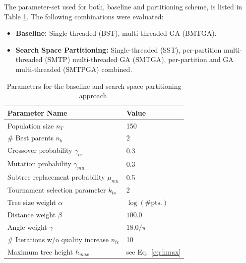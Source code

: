 The parameter-set used for both, baseline and partitioning scheme, is listed in Table \ref{tab:gaparams}.
The following combinations were evaluated:
\begin{itemize}
	\item \textbf{Baseline:} Single-threaded (BST), multi-threaded \ac{GA} (BMTGA).
	\item \textbf{Search Space Partitioning:} Single-threaded (SST), per-partition multi-threaded (SMTP) multi-threaded \ac{GA} (SMTGA), per-partition and \ac{GA} multi-threaded (SMTPGA) combined.
\end{itemize}
\begin{table}[h]
	\centering
	\begin{tabular}{|l|l|}
		\hline
		\textbf{Parameter Name} & \textbf{Value}  \\
		\hline
		Population size $n_T$ & 150 \\
		\hline
		\# Best parents $n_b$ & 2 \\
		\hline
		Crossover probability $\gamma_{cr}$& 0.3 \\
		\hline
		Mutation probability $\gamma_{mu}$& 0.3 \\
		\hline
		Subtree replacement probability $\mu_{mu}$& 0.5 \\
		\hline
		Tournament selection parameter $k_{ts}$ & 2\\
		\hline
		Tree size weight $\alpha$& $\log(\text{\#pts.})$\\
		\hline
		Distance weight $\beta$& $100.0$ \\
		\hline
		Angle weight $\gamma$& $18.0/\pi$ \\
		\hline 
		\# Iterations w/o quality increase $n_{tc}$ & 10 \\
		\hline 
		Maximum tree height $h_{max}$ & see Eq.~\ref{eq:hmax} \\
		\hline 
	\end{tabular}
	\caption{Parameters for the baseline and search space partitioning approach.}
	\label{tab:gaparams}
\end{table}   
